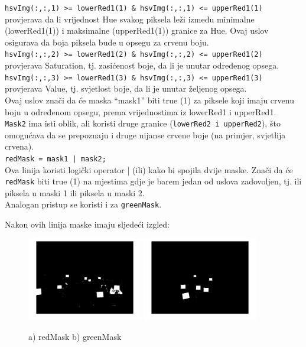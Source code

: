 \documentclass[a4paper,12pt]{article}
\begin{document}




\noindent \texttt{hsvImg(:,:,1) >= lowerRed1(1) \& hsvImg(:,:,1) <= upperRed1(1)} provjerava da li vrijednost Hue svakog piksela leži između minimalne (lowerRed1(1)) i maksimalne (upperRed1(1)) granice za Hue. 
Ovaj uslov osigurava da boja piksela bude u opsegu za crvenu boju.\\

 \texttt{hsvImg(:,:,2) >= lowerRed1(2) \& hsvImg(:,:,2) <= upperRed1(2)} provjerava Saturation, tj. zasićenost boje, da li je unutar određenog opsega.\\

\texttt{hsvImg(:,:,3) >= lowerRed1(3) \& hsvImg(:,:,3) <= upperRed1(3)} provjerava Value, tj. svjetlost boje, da li je unutar željenog opsega. \\

Ovaj uslov znači da će maska “mask1” biti true (1) za piksele koji imaju crvenu boju u određenom opsegu, prema vrijednostima iz lowerRed1 i upperRed1.\\

\texttt{Mask2} ima isti oblik, ali koristi druge granice (\texttt{lowerRed2 i upperRed2}), što omogućava da se prepoznaju i druge nijanse crvene boje (na primjer, svjetlija crvena).\\

\texttt{redMask = mask1 | mask2;}\\

Ova linija koristi logički operator | (ili) kako bi spojila dvije maske. Znači da će \texttt{redMask} biti true (1) na mjestima gdje je barem jedan od uslova zadovoljen, tj. ili piksela u maski 1 ili piksela u maski 2. \\

\noindent Analogan pristup se koristi i za \texttt{greenMask}.

Nakon ovih linija maske imaju sljedeći izgled:
\begin{figure}[htbp]
    \centering
    \includegraphics[width=0.45\textwidth]{redmask.jpg}
    \hfill
    \includegraphics[width=0.45\textwidth]{greenmask.jpg} 
    \caption{a) redMask b) greenMask}
    \label{fig:redMaskgreenMask}
\end{figure}
\end{document}
